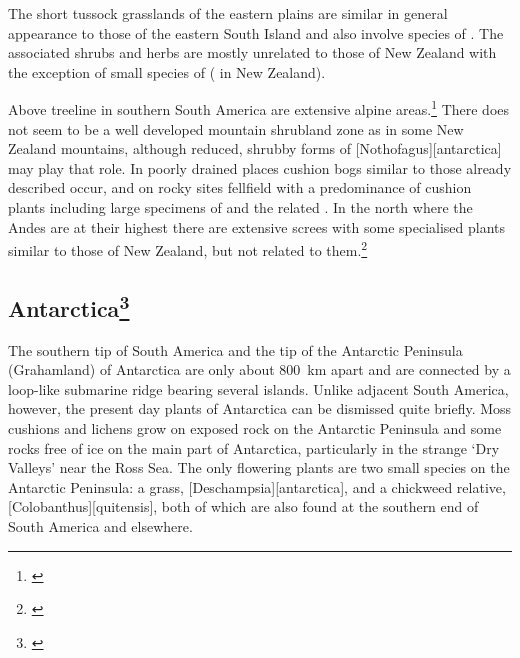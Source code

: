 The short tussock grasslands of the eastern plains are similar in general appearance to those of the eastern South Island and also involve species of .
The associated shrubs and herbs are mostly unrelated to those of New Zealand with the exception of small species of  ( in New Zealand).

Above treeline in southern South America are extensive alpine areas.\footnote{\cite{moore1975alpine}}
There does not seem to be a well developed mountain shrubland zone as in some New Zealand mountains, although reduced, shrubby forms of [Nothofagus][antarctica] may play that role.
In poorly drained places cushion bogs similar to those already described occur, and on rocky sites fellfield with a predominance of cushion plants including large specimens of  and the related .
In the north where the Andes are at their highest there are extensive screes with some specialised plants similar to those of New Zealand, but not related to them.\footnote{\cite{goodspeed1950plant}}

\subsection[Antarctica]{Antarctica\thinspace\footnote{\cite{wace1965vascular}}}

The southern tip of South America and the tip of the Antarctic Peninsula (Grahamland) of Antarctica are only about \SI{800}{\kilo\metre} apart and are connected by a loop-like submarine ridge bearing several islands.
Unlike adjacent South America, however, the present day plants of Antarctica can be dismissed quite briefly.
Moss cushions and lichens grow on exposed rock on the Antarctic Peninsula and some rocks free of ice on the main part of Antarctica, particularly in the strange `Dry Valleys' near the Ross Sea.
The only flowering plants are two small species on the Antarctic Peninsula: a grass, [Deschampsia][antarctica], and a chickweed relative, [Colobanthus][quitensis], both of which are also found at the southern end of South America and elsewhere.
